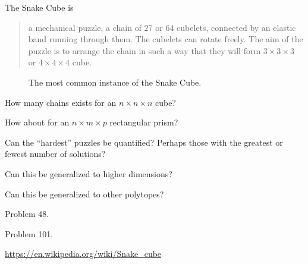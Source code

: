 \documentclass{article}
\begin{document}
The Snake Cube is \begin{quote}
  a mechanical puzzle, a chain of $27$ or $64$ cubelets, connected by an elastic
  band running through them. The cubelets can rotate freely. The aim of the
  puzzle is to arrange the chain in such a way that they will form
  $3 \times 3 \times 3$ or $4 \times 4 \times 4$ cube.
\end{quote}

\begin{figure}[ht!]
  \centering
  \caption{The most common instance of the Snake Cube.}
\end{figure}

\begin{question}
  How many chains exists for an $n \times n \times n$ cube?
\end{question}

\begin{related}
  \item How about for an $n \times m \times p$ rectangular prism?
  \item Can the ``hardest'' puzzles be quantified? Perhaps those with the
  greatest or fewest number of solutions?
  \item Can this be generalized to higher dimensions?
  \item Can this be generalized to other polytopes?
\end{related}

\begin{references}
  \item Problem 48.
  \item Problem 101.
  \item \url{https://en.wikipedia.org/wiki/Snake_cube}
\end{references}
\end{document}
